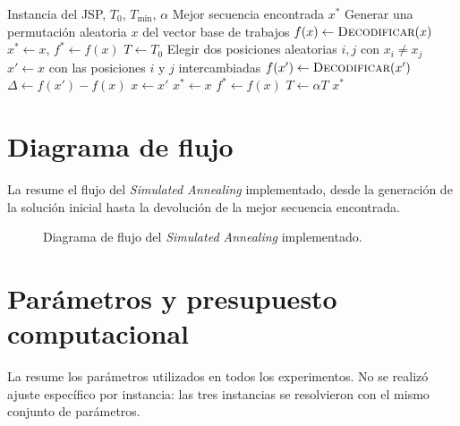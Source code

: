 \begin{algorithm}[htbp]
\caption{\emph{Simulated Annealing} para el JSP}
\label{alg:sa}
\begin{algorithmic}[1]
\Require Instancia del JSP, \(T_0\), \(T_{\min}\), \(\alpha\)
\Ensure Mejor secuencia encontrada \(x^{*}\)
\State Generar una permutación aleatoria \(x\) del vector base de trabajos
\State \(f(x) \gets \textsc{Decodificar}(x)\)
\State \(x^{*} \gets x\), \(f^{*} \gets f(x)\)
\State \(T \gets T_0\)
    \State Elegir dos posiciones aleatorias \(i,j\) con \(x_i \neq x_j\)
    \State \(x' \gets x\) con las posiciones \(i\) y \(j\) intercambiadas
    \State \(f(x') \gets \textsc{Decodificar}(x')\)
    \State \(\Delta \gets f(x') - f(x)\)
        \State \(x \gets x'\)
            \State \(x^{*} \gets x\)
            \State \(f^{*} \gets f(x)\)
        \EndIf
    \EndIf
    \State \(T \gets \alpha T\)
\EndWhile
\State \Return \(x^{*}\)
\end{algorithmic}
\end{algorithm}

\section{Diagrama de flujo}

La  resume el flujo del \emph{Simulated Annealing} implementado,
desde la generación de la solución inicial hasta la devolución de la mejor secuencia encontrada.

\begin{figure}[H]
\centering

\caption{Diagrama de flujo del \emph{Simulated Annealing} implementado.}
\label{fig:flujo_sa}
\end{figure}

\section{Parámetros y presupuesto computacional}

La  resume los parámetros utilizados en todos los experimentos.
No se realizó ajuste específico por instancia:
las tres instancias se resolvieron con el mismo conjunto de parámetros.

